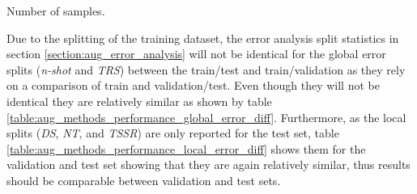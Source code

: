 \begin{table}[h!]
    \centering
    
    \caption{Number of samples.}
    \label{table:aug_methods_performance_split_breakdown}
\end{table}

Due to the splitting of the training dataset, the error analysis split statistics in section \ref{section:aug_error_analysis} will not be identical for the global error splits (\textit{n-shot} and \textit{TRS}) between the train/test and train/validation as they rely on a comparison of train and validation/test. Even though they will not be identical they are relatively similar as shown by table \ref{table:aug_methods_performance_global_error_diff}. Furthermore, as the local splits (\textit{DS}, \textit{NT}, and \textit{TSSR}) are only reported for the test set, table \ref{table:aug_methods_performance_local_error_diff} shows them for the validation and test set showing that they are again relatively similar, thus results should be comparable between validation and test sets.

